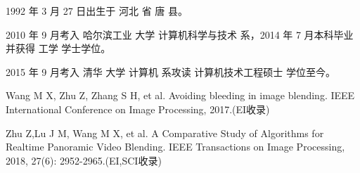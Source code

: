 \begin{resume}


  1992 年 3 月 27 日出生于 河北 省 唐 县。

  2010 年 9 月考入 哈尔滨工业 大学 计算机科学与技术 系，2014 年 7 月本科毕业并获得 工学 学士学位。

  2015 年 9 月考入 清华 大学 计算机 系攻读 计算机技术工程硕士 学位至今。


  \begin{publications}
    \item Wang M X, Zhu Z, Zhang S H, et al.
 Avoiding bleeding in image blending. IEEE International Conference on Image Processing, 2017.(EI收录)
  \end{publications}


  \begin{publications}
    \item Zhu Z,Lu J M, Wang M X, et al. A Comparative Study of Algorithms for Realtime Panoramic Video Blending.
      IEEE Transactions on Image Processing, 2018, 27(6): 2952-2965.(EI,SCI收录)
  \end{publications}


\end{resume}
